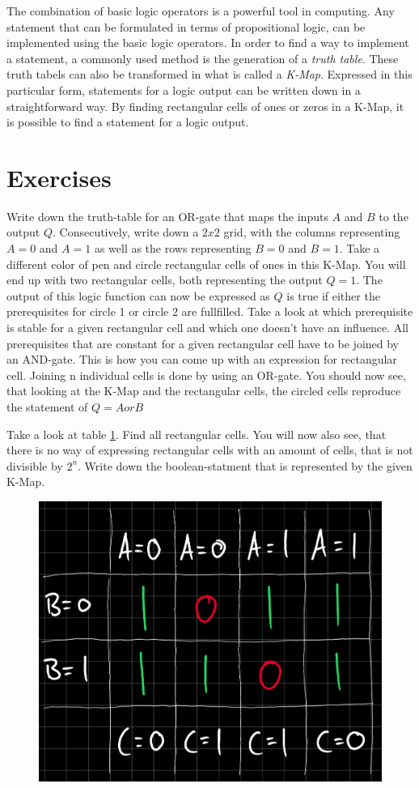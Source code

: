 \documentclass{dcbl/challenge}
\begin{document}
The combination of basic logic operators is a powerful tool in computing.
Any statement that can be formulated in terms of propositional logic, can be implemented using the basic logic operators. 
In order to find a way to implement a statement, a commonly used method is the generation of a \textit{truth table}.
These truth tabels can also be transformed in what is called a \textit{K-Map}.
Expressed in this particular form, statements for a logic output can be written down in a straightforward way. 
By finding rectangular cells of ones or zeros in a K-Map, it is possible to find a statement for a logic output.
\section*{Exercises}
\begin{aufgabe}
    Write down the truth-table for an OR-gate that maps the inputs $A$ and $B$ to the output $Q$. 
    Consecutively, write down a $2x2$ grid, with the columns representing $A=0$ and $A=1$ as well as the rows representing $B=0$ and $B=1$.
    Take a different color of pen and circle rectangular cells of ones in this K-Map. 
    You will end up with two rectangular cells, both representing the output $Q=1$.
    The output of this logic function can now be expressed as $Q$ is true if either the prerequisites for circle 1 or circle 2 are fullfilled. 
    Take a look at which prerequisite is stable for a given rectangular cell and which one doesn't have an influence. 
    All prerequisites that are constant for a given rectangular cell have to be joined by an AND-gate.
    This is how you can come up with an expression for rectangular cell. 
    Joining n individual cells is done by using an OR-gate.
    You should now see, that looking at the K-Map and the rectangular cells, the circled cells reproduce the statement of $Q = A or B$
\end{aufgabe}
\begin{aufgabe}
    Take a look at table \ref{fig:ABC}. 
    Find all rectangular cells.
    You will now also see, that there is no way of expressing rectangular cells with an amount of cells, that is not divisible by $2^n$.
    Write down the boolean-statment that is represented by the given K-Map.\\
    \begin{figure}
        \centering
        \includegraphics[width=.4\linewidth]{ABC.png}
        \label{fig:ABC} 
    \end{figure}
\end{aufgabe}
\end{document}
